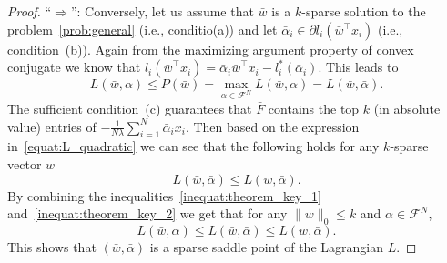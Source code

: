 \documentclass[11pt]{article}
\numberwithin{equation}{section}
\numberwithin{table}{section}
\numberwithin{figure}{section}
\begin{document}
\begin{proof}
``$\Rightarrow$'': Conversely, let us assume that $\bar w$ is a $k$-sparse solution to the problem~\eqref{prob:general} (i.e., conditio(a)) and let $\bar \alpha_i\in \partial l_i(\bar w^\top x_i)$ (i.e., condition~(b)). Again from the maximizing argument property of convex conjugate we know that $l_i(\bar w^\top x_i) = \bar \alpha_i  \bar w^\top x_i - l^*_i(\bar \alpha_i)$. This leads to
\begin{equation}\label{inequat:theorem_key_1}
L(\bar w, \alpha) \le P(\bar w) = \max_{\alpha \in \mathcal{F}^N} L(\bar w, \alpha) = L(\bar w, \bar\alpha).
\end{equation}
The sufficient condition~(c) guarantees that $\bar F$ contains the top $k$ (in absolute value) entries of $-\frac{1}{N\lambda} \sum_{i=1}^N \bar\alpha_i x_i$. Then based on the expression in~\eqref{equat:L_quadratic} we can see that the following holds for any $k$-sparse vector $w$
\begin{equation}\label{inequat:theorem_key_2}
L(\bar w, \bar\alpha) \le L(w,\bar \alpha).
\end{equation}
By combining the inequalities~\eqref{inequat:theorem_key_1} and~\eqref{inequat:theorem_key_2} we get that for any $\|w\|_0\le k$ and $\alpha \in \mathcal{F}^N$,
\[
L(\bar w, \alpha) \le L(\bar w, \bar \alpha) \le L(w, \bar \alpha).
\]
This shows that $(\bar w, \bar \alpha)$ is a sparse saddle point of the Lagrangian $L$.
\end{proof}
\end{document}
